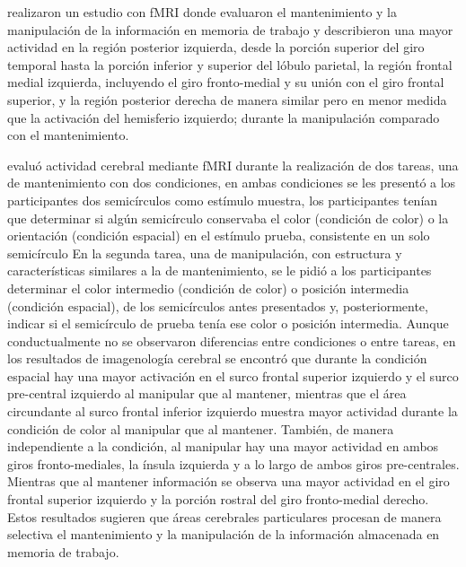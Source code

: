 \documentclass[12pt,letterpaper,final]{article}
\begin{document}
 realizaron un estudio con fMRI donde evaluaron el mantenimiento y la manipulación de la información en  memoria de trabajo y describieron  una mayor actividad en la región posterior izquierda, desde la porción superior del giro temporal hasta la porción inferior y superior del lóbulo parietal, la región frontal medial izquierda, incluyendo el giro fronto-medial y su unión con el giro frontal superior, y la región posterior derecha de manera similar pero en menor medida que la activación del hemisferio izquierdo;  durante la manipulación comparado con el mantenimiento.


 evaluó actividad cerebral mediante fMRI durante la realización de dos tareas, una de mantenimiento con dos condiciones, en ambas condiciones se les presentó a los participantes dos semicírculos como estímulo  muestra, los participantes tenían que determinar si algún semicírculo conservaba el color (condición de color) o la orientación (condición espacial) en el estímulo  prueba, consistente en un solo semicírculo En la segunda tarea, una de manipulación, con estructura y características similares a la de mantenimiento, se le pidió a los participantes determinar el color intermedio (condición de color) o posición intermedia (condición espacial), de los semicírculos antes presentados y, posteriormente, indicar si el semicírculo de prueba tenía ese color o posición intermedia.
Aunque conductualmente no se observaron diferencias entre condiciones o entre tareas, en los resultados de imagenología cerebral se encontró  que durante la condición espacial hay una mayor activación en el surco frontal superior izquierdo y el surco pre-central izquierdo al manipular que al mantener, mientras que el área circundante al surco frontal inferior izquierdo muestra mayor actividad durante la condición de color al manipular que al mantener. 
También, de manera independiente a la condición, al manipular hay una mayor actividad en ambos giros fronto-mediales, la ínsula izquierda y a lo largo de ambos giros pre-centrales. Mientras que al mantener información se observa una mayor actividad en el giro frontal superior izquierdo y la porción rostral del giro fronto-medial derecho. Estos resultados sugieren que áreas cerebrales particulares procesan de manera selectiva el mantenimiento y la manipulación de la información almacenada en memoria de trabajo.
\end{document}
